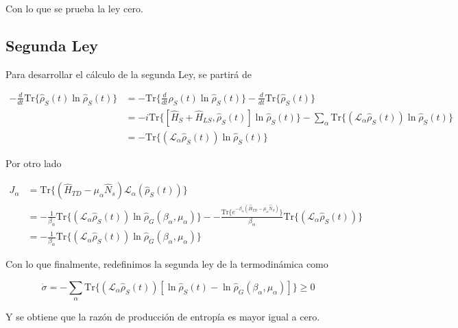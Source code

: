 \begin{appendixs}
Con lo que se prueba la ley cero.

\newpage


\subsection{Segunda Ley}
Para desarrollar el cálculo de la segunda Ley, se partirá de

\begin{align*}
    - \frac{d}{dt}\text{Tr}\{ \hat{\rho}_{S}(t)\ln \hat{\rho}_{S}(t) \} & =  -\text{Tr}\Big\{ \frac{d}{dt}\hat{\rho}_{S}(t)\ln \hat{\rho}_{S}(t) \Big\} - \frac{d}{dt}\text{Tr}\{\hat{\rho}_{S}(t) \}\\
  & = - i \text{Tr}\{[\hat{H}_{S}+\hat{H}_{LS},\hat{\rho}_{S}(t)]\ln \hat{\rho}_{S}(t)  \} - \sum_{\alpha} \text{Tr}\{(\mathcal{L}_{\alpha}\hat{\rho}_{S}(t)) \ln \hat{\rho}_{S}(t) \}  \\
  & = -\text{Tr}\{(\mathcal{L}_{\alpha}\hat{\rho}_{S}(t)) \ln \hat{\rho}_{S}(t) \}
\end{align*}

Por otro lado

\begin{align*}
    J_{\alpha} & = \text{Tr}\{ (\hat{H}_{TD} - \mu_{\alpha}\hat{N}_{s})\mathcal{L}_{\alpha}(\hat{\rho}_{S}(t)) \} \\
    & = -\frac{1}{\beta_{\alpha}} \text{Tr}\{(\mathcal{L}_{\alpha}\hat{\rho}_{S}(t)) \ln \hat{\rho}_{G}(\beta_{\alpha},\mu_{\alpha})  \} - -\frac{\text{Tr}\{e^{-\beta_{\alpha}(\hat{H}_{TD} - \mu_{\alpha}\hat{N}_{S})} \} }{\beta_{\alpha}} \text{Tr}\{(\mathcal{L}_{\alpha}\hat{\rho}_{S}(t)) \} \\
    & = -\frac{1}{\beta_{\alpha}} \text{Tr}\{(\mathcal{L}_{\alpha}\hat{\rho}_{S}(t))\ln \hat{\rho}_{G}(\beta_{\alpha},\mu_{\alpha})  \}
\end{align*}

Con lo que finalmente, redefinimos la segunda ley de la termodinámica como

\begin{equation*}
    \dot{\sigma} = - \sum_{\alpha} \text{Tr}\{(\mathcal{L}_{\alpha}\hat{\rho}_{S}(t)) [\ln \hat{\rho}_{S}(t) -\ln \hat{\rho}_{G}(\beta_{\alpha},\mu_{\alpha}) ] \} \geq 0
\end{equation*}

Y se obtiene que la razón de producción de entropía es mayor igual a cero.


\end{appendixs}
